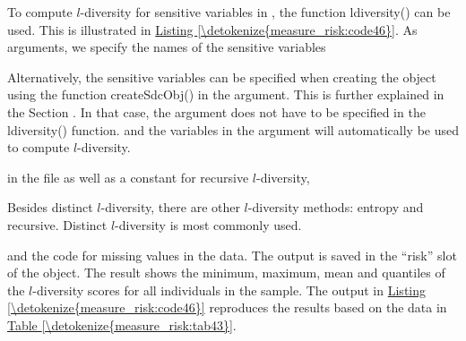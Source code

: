 \documentclass[letterpaper,10pt,english]{sphinxmanual}
\begin{document}
To compute \(l\)-diversity for sensitive variables in ,
the function ldiversity() can be used. This is illustrated in \hyperref[\detokenize{measure_risk:code46}]{Listing \ref{\detokenize{measure_risk:code46}}}.
As arguments, we specify the names of the sensitive
variables %
\begin{footnote}[9]\sphinxAtStartFootnote
Alternatively, the sensitive variables can be specified when
creating the  object using the function createSdcObj() in
the  argument. This is further explained in the Section
 .
In that case, the argument  does not have to be specified
in the ldiversity() function. and the variables in the 
argument will automatically be used to compute \(l\)-diversity.
%
\end{footnote} in the file as well as a constant for
recursive \(l\)-diversity, %
\begin{footnote}[10]\sphinxAtStartFootnote
Besides distinct \(l\)-diversity, there are other
\(l\)-diversity methods: entropy and recursive. Distinct
\(l\)-diversity is most commonly used.
%
\end{footnote} and the code for
missing values in the data. The output is saved in the “risk” slot of
the  object. The result shows the minimum, maximum, mean and
quantiles of the \(l\)-diversity scores for all individuals in the
sample. The output in \hyperref[\detokenize{measure_risk:code46}]{Listing \ref{\detokenize{measure_risk:code46}}} reproduces the results based on the
data in \hyperref[\detokenize{measure_risk:tab43}]{Table \ref{\detokenize{measure_risk:tab43}}}.
\end{document}
